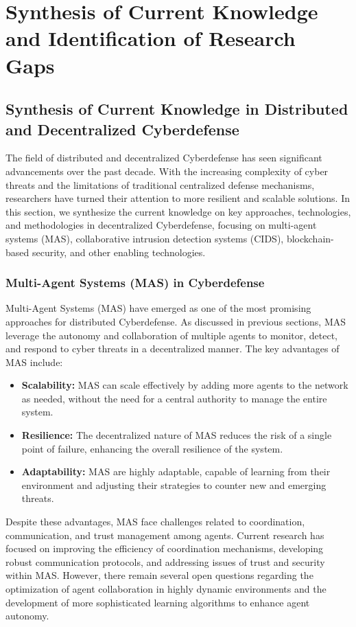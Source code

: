 \section{Synthesis of Current Knowledge and Identification of Research Gaps}

\subsection{Synthesis of Current Knowledge in Distributed and Decentralized Cyberdefense}

The field of distributed and decentralized Cyberdefense has seen significant advancements over the past decade. With the increasing complexity of cyber threats and the limitations of traditional centralized defense mechanisms, researchers have turned their attention to more resilient and scalable solutions. In this section, we synthesize the current knowledge on key approaches, technologies, and methodologies in decentralized Cyberdefense, focusing on multi-agent systems (MAS), collaborative intrusion detection systems (CIDS), blockchain-based security, and other enabling technologies.

\subsubsection{Multi-Agent Systems (MAS) in Cyberdefense}

Multi-Agent Systems (MAS) have emerged as one of the most promising approaches for distributed Cyberdefense. As discussed in previous sections, MAS leverage the autonomy and collaboration of multiple agents to monitor, detect, and respond to cyber threats in a decentralized manner. The key advantages of MAS include:

\begin{itemize}
    \item \textbf{Scalability:} MAS can scale effectively by adding more agents to the network as needed, without the need for a central authority to manage the entire system.
    \item \textbf{Resilience:} The decentralized nature of MAS reduces the risk of a single point of failure, enhancing the overall resilience of the system.
    \item \textbf{Adaptability:} MAS are highly adaptable, capable of learning from their environment and adjusting their strategies to counter new and emerging threats.
\end{itemize}

Despite these advantages, MAS face challenges related to coordination, communication, and trust management among agents. Current research has focused on improving the efficiency of coordination mechanisms, developing robust communication protocols, and addressing issues of trust and security within MAS. However, there remain several open questions regarding the optimization of agent collaboration in highly dynamic environments and the development of more sophisticated learning algorithms to enhance agent autonomy.


